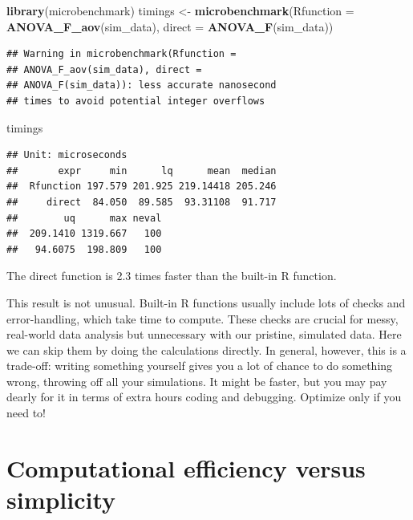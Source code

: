 \documentclass[
]{book}
\newenvironment{Shaded}{\begin{snugshade}}{\end{snugshade}}
\newcommand{\AttributeTok}[1]{\textcolor[rgb]{0.13,0.29,0.53}{#1}}
\newcommand{\FunctionTok}[1]{\textcolor[rgb]{0.13,0.29,0.53}{\textbf{#1}}}
\newcommand{\NormalTok}[1]{#1}
\newcommand{\OtherTok}[1]{\textcolor[rgb]{0.56,0.35,0.01}{#1}}
\begin{document}
\begin{Shaded}
\begin{Highlighting}[]
\FunctionTok{library}\NormalTok{(microbenchmark)}
\NormalTok{timings }\OtherTok{\textless{}{-}} \FunctionTok{microbenchmark}\NormalTok{(}\AttributeTok{Rfunction =} \FunctionTok{ANOVA\_F\_aov}\NormalTok{(sim\_data),}
                          \AttributeTok{direct    =} \FunctionTok{ANOVA\_F}\NormalTok{(sim\_data))}
\end{Highlighting}
\end{Shaded}

\begin{verbatim}
## Warning in microbenchmark(Rfunction =
## ANOVA_F_aov(sim_data), direct =
## ANOVA_F(sim_data)): less accurate nanosecond
## times to avoid potential integer overflows
\end{verbatim}

\begin{Shaded}
\begin{Highlighting}[]
\NormalTok{timings}
\end{Highlighting}
\end{Shaded}

\begin{verbatim}
## Unit: microseconds
##       expr     min      lq      mean  median
##  Rfunction 197.579 201.925 219.14418 205.246
##     direct  84.050  89.585  93.31108  91.717
##        uq      max neval
##  209.1410 1319.667   100
##   94.6075  198.809   100
\end{verbatim}

The direct function is 2.3 times faster than the built-in R function.

This result is not unusual.
Built-in R functions usually include lots of checks and error-handling, which take time to compute. These checks are crucial for messy, real-world data analysis but unnecessary with our pristine, simulated data.
Here we can skip them by doing the calculations directly.
In general, however, this is a trade-off: writing something yourself gives you a lot of chance to do something wrong, throwing off all your simulations. It might be faster, but you may pay dearly for it in terms of extra hours coding and debugging.
Optimize only if you need to!

\section{Computational efficiency versus simplicity}\label{sec_comp_efficiency}
\end{document}
